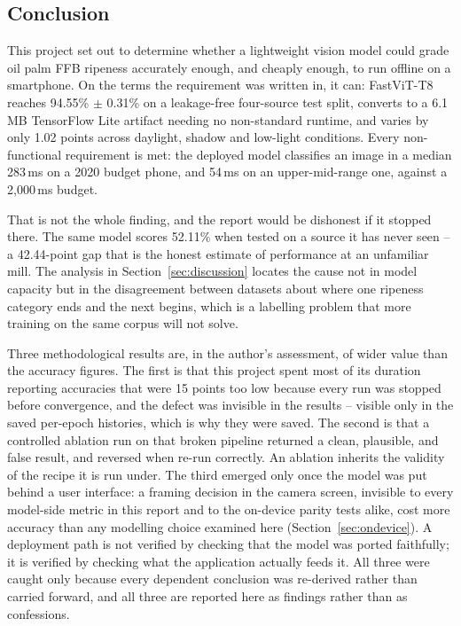 \documentclass{article}
\begin{document}
\subsection{Conclusion}

This project set out to determine whether a lightweight vision model could grade oil palm FFB ripeness
accurately enough, and cheaply enough, to run offline on a smartphone. On the terms the requirement was
written in, it can: FastViT-T8 reaches 94.55\% $\pm$ 0.31\% on a leakage-free four-source test split,
converts to a 6.1\,MB TensorFlow Lite artifact needing no non-standard runtime, and varies by only 1.02
points across daylight, shadow and low-light conditions. Every non-functional requirement is met: the
deployed model classifies an image in a median 283\,ms on a 2020 budget phone, and 54\,ms on an
upper-mid-range one, against a 2{,}000\,ms budget.

That is not the whole finding, and the report would be dishonest if it stopped there. The same model
scores 52.11\% when tested on a source it has never seen -- a 42.44-point gap that is the honest estimate
of performance at an unfamiliar mill. The analysis in Section~\ref{sec:discussion} locates the cause not
in model capacity but in the disagreement between datasets about where one ripeness category ends and the
next begins, which is a labelling problem that more training on the same corpus will not solve.

Three methodological results are, in the author's assessment, of wider value than the accuracy figures.
The first is that this project spent most of its duration reporting accuracies that were 15 points too low
because every run was stopped before convergence, and the defect was invisible in the results -- visible
only in the saved per-epoch histories, which is why they were saved. The second is that a controlled
ablation run on that broken pipeline returned a clean, plausible, and false result, and reversed when
re-run correctly. An ablation inherits the validity of the recipe it is run under. The third emerged only
once the model was put behind a user interface: a framing decision in the camera screen, invisible to
every model-side metric in this report and to the on-device parity tests alike, cost more accuracy than
any modelling choice examined here (Section~\ref{sec:ondevice}). A deployment path is not verified by
checking that the model was ported faithfully; it is verified by checking what the application actually
feeds it. All three were caught only because every dependent conclusion was re-derived rather than carried
forward, and all three are reported here as findings rather than as confessions.
\end{document}
